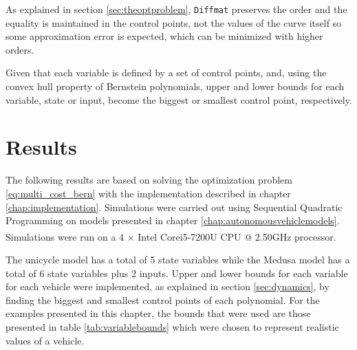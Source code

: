 \par As explained in section \ref{sec:theoptproblem}, \texttt{Diffmat} preserves the order and the equality is maintained in the control points, not the values of the curve itself so some approximation error is expected, which can be minimized with higher orders.

\par Given that each variable is defined by a set of control points, and, using the convex hull property of Bernstein polynomials, upper and lower bounds for each variable, state or input, become the biggest or smallest control point, respectively.


\section{Results}
\par The following results are based on solving the optimization problem \eqref{eq:multi_cost_bern} with the implementation described in chapter \ref{chap:implementation}. Simulations were carried out using Sequential Quadratic Programming \cite{10.1007/978-0-387-35514-6_7} on models presented in chapter \ref{chap:autonomousvehiclemodels}. Simulations were run on a 4 × Intel\textsuperscript{\textcopyright} Core\texttrademark i5-7200U CPU @ 2.50GHz processor. 
\par The unicycle model has a total of 5 state variables while the Medusa model has a total of 6 state variables plus 2 inputs. Upper and lower bounds for each variable for each vehicle were implemented, as explained in section \ref{sec:dynamics}, by finding the biggest and smallest control points of each polynomial. For the examples presented in this chapter, the bounds that were used are those presented in table \ref{tab:variablebounds} which were chosen to represent realistic values of a vehicle.

